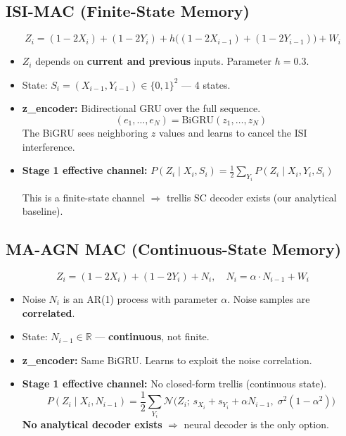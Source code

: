 \documentclass[11pt]{article}
\begin{document}
\subsection{ISI-MAC (Finite-State Memory)}

\[
\boxed{Z_i = (1{-}2X_i) + (1{-}2Y_i) + h\bigl((1{-}2X_{i-1}) + (1{-}2Y_{i-1})\bigr) + W_i}
\]

\begin{itemize}
\item $Z_i$ depends on \textbf{current and previous} inputs. Parameter $h = 0.3$.
\item State: $S_i = (X_{i-1}, Y_{i-1}) \in \{0,1\}^2$ --- 4 states.
\item \textbf{z\_encoder:} Bidirectional GRU over the full sequence.
\[
(e_1, \ldots, e_N) = \text{BiGRU}(z_1, \ldots, z_N)
\]
The BiGRU sees neighboring $z$ values and learns to cancel the ISI interference.
\item \textbf{Stage 1 effective channel:} $P(Z_i \mid X_i, S_i) = \frac{1}{2}\sum_{Y_i} P(Z_i \mid X_i, Y_i, S_i)$

This is a finite-state channel $\Rightarrow$ trellis SC decoder exists (our analytical baseline).
\end{itemize}

\subsection{MA-AGN MAC (Continuous-State Memory)}

\[
\boxed{Z_i = (1{-}2X_i) + (1{-}2Y_i) + N_i, \quad N_i = \alpha \cdot N_{i-1} + W_i}
\]

\begin{itemize}
\item Noise $N_i$ is an AR(1) process with parameter $\alpha$. Noise samples are \textbf{correlated}.
\item State: $N_{i-1} \in \mathbb{R}$ --- \textbf{continuous}, not finite.
\item \textbf{z\_encoder:} Same BiGRU. Learns to exploit the noise correlation.
\item \textbf{Stage 1 effective channel:} No closed-form trellis (continuous state).
\[
P(Z_i \mid X_i, N_{i-1}) = \frac{1}{2}\sum_{Y_i} \mathcal{N}\bigl(Z_i;\, s_{X_i} + s_{Y_i} + \alpha N_{i-1},\;\sigma^2(1-\alpha^2)\bigr)
\]
\textbf{No analytical decoder exists} $\Rightarrow$ neural decoder is the only option.
\end{itemize}

\end{document}
